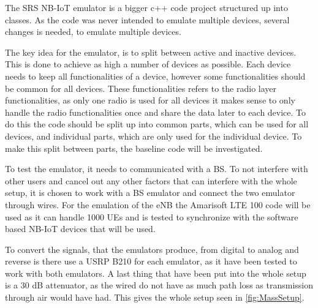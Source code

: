 The SRS NB-IoT emulator is a bigger c++ code project structured up into classes. As the code was never intended to emulate multiple devices, several changes is needed, to emulate multiple devices.



The key idea for the emulator, is to split between active and inactive devices. This is done to achieve as high a number of devices as possible. Each device needs to keep all functionalities of a device, however some functionalities should be common for all devices. These functionalities refers to the radio layer functionalities, as only one radio is used for all devices it makes sense to only handle the radio functionalities once and share the data later to each device. To do this the code should be split up into common parts, which can be used for all devices, and individual parts, which are only used for the individual device. To make this split between parts, the baseline code will be investigated.

To test the emulator, it needs to communicated with a BS. To not interfere with other users and cancel out any other factors that can interfere with the whole setup, it is chosen to work with a BS emulator and connect the two emulator through wires. For the emulation of the eNB the Amarisoft LTE 100 code will be used as it can handle 1000 \gls{UE}s \citep{Amarisoft_solutions} and is tested to synchronize with the software based NB-IoT devices that will be used. 

To convert the signals, that the emulators produce, from digital to analog and reverse is there use a USRP B210 for each emulator, as it have been tested to work with both emulators. A last thing that have been put into the whole setup is a 30 dB attenuator, as the wired do not have as much path loss as transmission through air would have had.
This gives the whole setup seen in \autoref{fig:MassSetup}. 







